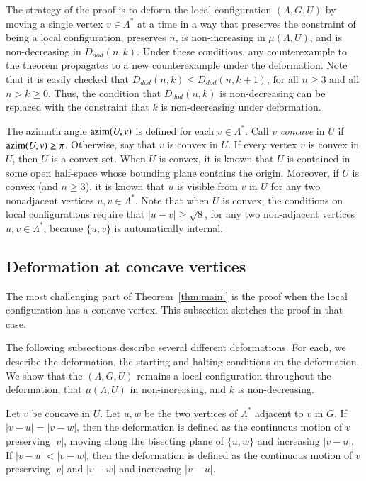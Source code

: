 \documentclass{article} %
\begin{document}
The strategy of the proof is to deform the local configuration
$(\Lambda,G,U)$ by moving a single vertex $v\in\Lambda^*$ at a time in
a way that preserves the constraint of being a local configuration,
preserves $n$, is non-increasing in $\mu(\Lambda,U)$, and is
non-decreasing in $D_{dod}(n,k)$. Under these conditions, any
counterexample to the theorem propagates to a new counterexample under
the deformation. Note that it is easily checked that $D_{dod}(n,k) \le
D_{dod}(n,k+1)$, for all $n\ge 3$ and all $n> k\ge0$. Thus, the
condition that $D_{dod}(n,k)$ is non-decreasing can be replaced with
the constraint that $k$ is non-decreasing under deformation.

The azimuth angle ${\operatorname{azim}}(U,v)$ is defined for each
$v\in\Lambda^*$. Call $v$ {\it concave} in $U$ if
${\operatorname{azim}}(U,v)\ge\pi$. Otherwise, say that $v$ is convex in $U$. If
every vertex $v$ is convex in $U$, then $U$ is a convex set. When $U$
is convex, it is known that $U$ is contained in some open half-space
whose bounding plane contains the origin. Moreover, if $U$ is convex
(and $n\ge 3$), it is known that $u$ is visible from $v$ in $U$ for
any two nonadjacent vertices $u,v\in\Lambda^*$. Note that when $U$ is
convex, the conditions on local configurations require that
$|u-v|\ge\sqrt8$, for any two non-adjacent vertices $u,v\in\Lambda^*$,
because $\{u,v\}$ is automatically internal.

\subsection{Deformation at concave vertices}\label{sec:concave}

The most challenging part  of Theorem~\ref{thm:main'} is the
proof when the local configuration has a concave vertex.  This subsection
sketches the proof in that case.

The following subsections describe several different  deformations.  For each,
we describe the deformation, the starting and halting conditions on 
the deformation.  We show that the $(\Lambda,G,U)$ remains a local
configuration throughout the deformation, 
 that  $\mu(\Lambda,U)$ in non-increasing, and $k$ is
non-decreasing.

Let $v$ be concave in $U$.  Let $u,w$ be the two vertices of
$\Lambda^*$ adjacent to $v$ in $G$. 
If $|v-u|=|v-w|$, then the deformation is defined as the continuous motion
of $v$ preserving $|v|$,  moving along the bisecting plane of $\{u,w\}$
and increasing $|v-u|$.  If $|v-u|<|v-w|$, then the deformation
is defined as the continuous motion of $v$ preserving $|v|$ and
$|v-w|$ and increasing $|v-u|$.
\end{document}
